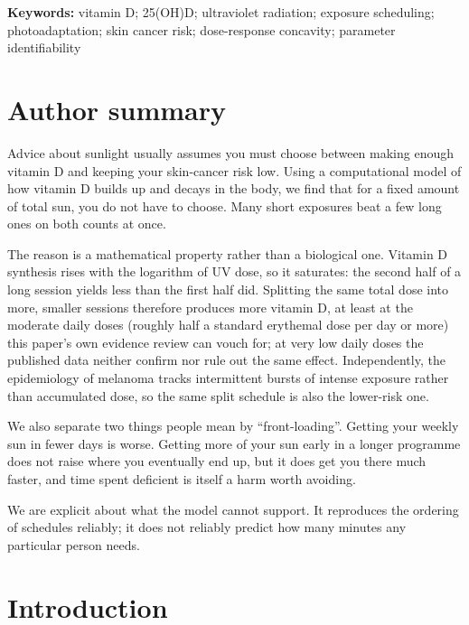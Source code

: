 \documentclass[11pt]{article}
\begin{document}
\vspace{0.5em}
\noindent\textbf{Keywords:} vitamin D; 25(OH)D; ultraviolet radiation;
exposure scheduling; photoadaptation; skin cancer risk; dose-response
concavity; parameter identifiability

\section*{Author summary}

Advice about sunlight usually assumes you must choose between making
enough vitamin D and keeping your skin-cancer risk low. Using a
computational model of how vitamin D builds up and decays in the body,
we find that for a fixed amount of total sun, you do not have to
choose. Many short exposures beat a few long ones on both counts at
once.

The reason is a mathematical property rather than a biological one.
Vitamin D synthesis rises with the logarithm of UV dose, so it
saturates: the second half of a long session yields less than the
first half did. Splitting the same total dose into more, smaller
sessions therefore produces more vitamin D, at least at the moderate
daily doses (roughly half a standard erythemal dose per day or more)
this paper's own evidence review can vouch for; at very low daily
doses the published data neither confirm nor rule out the same effect.
Independently, the epidemiology of melanoma tracks intermittent bursts
of intense exposure rather than accumulated dose, so the same split
schedule is also the lower-risk one.

We also separate two things people mean by ``front-loading''. Getting
your weekly sun in fewer days is worse. Getting more of your sun early
in a longer programme does not raise where you eventually end up, but
it does get you there much faster, and time spent deficient is itself
a harm worth avoiding.

We are explicit about what the model cannot support. It reproduces the
ordering of schedules reliably; it does not reliably predict how many
minutes any particular person needs.

\section{Introduction}
\end{document}
